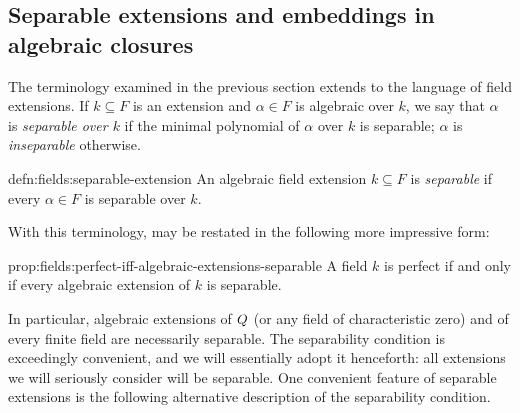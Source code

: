 \subsection{Separable extensions and embeddings in algebraic
  closures}%
\label{subsec:fields:separable-extensions-and-embeddings-in-algebraic-closures}
The terminology examined in the previous section extends to the
language of field extensions. If $k \subseteq F$ is an extension and
$\alpha \in F$ is algebraic over $k$, we say that $\alpha$ is
\emph{separable over $k$} if the minimal polynomial of $\alpha$ over
$k$ is separable; $\alpha$ is \emph{inseparable} otherwise.
\begin{defn}{}{defn:fields:separable-extension}
  An algebraic field extension $k \subseteq F$ is \emph{separable} if
  every $\alpha \in F$ is separable over $k$.
\end{defn}
With this terminology,  may be restated in the
following more impressive form:
\begin{prop}{}{prop:fields:perfect-iff-algebraic-extensions-separable}
  A field $k$ is perfect if and only if every algebraic extension of
  $k$ is separable.
\end{prop}
In particular, algebraic extensions of $Q$ (or any field of
characteristic zero) and of every finite field are necessarily
separable.  The separability condition is exceedingly convenient, and
we will essentially adopt it henceforth: all extensions we will
seriously consider will be separable. One convenient feature of
separable extensions is the following alternative description of the
separability condition.

